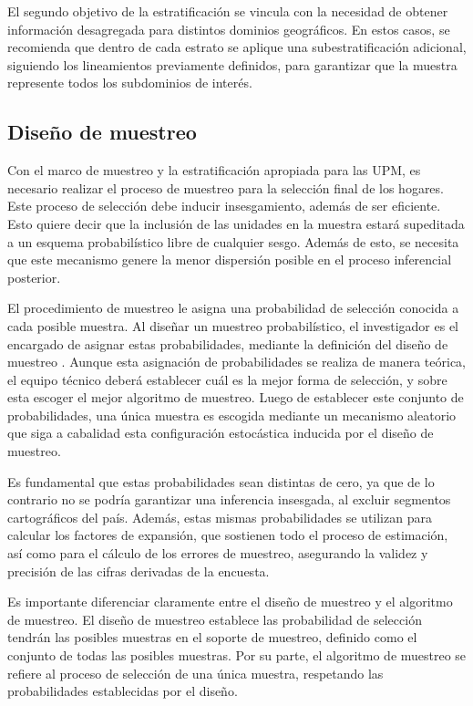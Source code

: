 \documentclass[
  12pt,
]{book}
\begin{document}
El segundo objetivo de la estratificación se vincula con la necesidad de obtener información desagregada para distintos dominios geográficos. En estos casos, se recomienda que dentro de cada estrato se aplique una subestratificación adicional, siguiendo los lineamientos previamente definidos, para garantizar que la muestra represente todos los subdominios de interés.

\subsection{Diseño de muestreo}\label{diseuxf1o-de-muestreo}

Con el marco de muestreo y la estratificación apropiada para las UPM, es necesario realizar el proceso de muestreo para la selección final de los hogares. Este proceso de selección debe inducir insesgamiento, además de ser eficiente. Esto quiere decir que la inclusión de las unidades en la muestra estará supeditada a un esquema probabilístico libre de cualquier sesgo. Además de esto, se necesita que este mecanismo genere la menor dispersión posible en el proceso inferencial posterior.

El procedimiento de muestreo le asigna una probabilidad de selección conocida a cada posible muestra. Al diseñar un muestreo probabilístico, el investigador es el encargado de asignar estas probabilidades, mediante la definición del diseño de muestreo \citep{Sarndal_Swensson_Wretman_2003}. Aunque esta asignación de probabilidades se realiza de manera teórica, el equipo técnico deberá establecer cuál es la mejor forma de selección, y sobre esta escoger el mejor algoritmo de muestreo. Luego de establecer este conjunto de probabilidades, una única muestra es escogida mediante un mecanismo aleatorio que siga a cabalidad esta configuración estocástica inducida por el diseño de muestreo.

Es fundamental que estas probabilidades sean distintas de cero, ya que de lo contrario no se podría garantizar una inferencia insesgada, al excluir segmentos cartográficos del país. Además, estas mismas probabilidades se utilizan para calcular los factores de expansión, que sostienen todo el proceso de estimación, así como para el cálculo de los errores de muestreo, asegurando la validez y precisión de las cifras derivadas de la encuesta.

Es importante diferenciar claramente entre el diseño de muestreo y el algoritmo de muestreo. El diseño de muestreo establece las probabilidad de selección tendrán las posibles muestras en el soporte de muestreo, definido como el conjunto de todas las posibles muestras. Por su parte, el algoritmo de muestreo se refiere al proceso de selección de una única muestra, respetando las probabilidades establecidas por el diseño.
\end{document}
